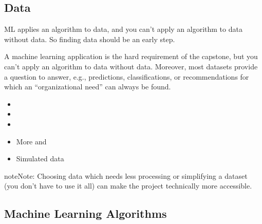 \documentclass[letterpaper,10pt,english]{jupyterBook}
\begin{document}
\subsection{Data}
\label{\detokenize{task1:data}}
\sphinxAtStartPar
ML applies an algorithm to data, and you can’t apply an algorithm to data \sphinxhyphen{}without data. So finding data should be an early step.

\sphinxAtStartPar
A machine learning application is the hard requirement of the capstone, but you can’t apply an algorithm to data \sphinxhyphen{}without data. Moreover, most datasets provide a question to answer, e.g., predictions, classifications, or recommendations for which an “organizational need” can always be found.
\begin{itemize}
\item {} 
\sphinxAtStartPar
{}

\item {} 
\sphinxAtStartPar
{}

\item {} 
\sphinxAtStartPar
{}

\item {} 
\sphinxAtStartPar
More  and 

\item {} 
\sphinxAtStartPar
Simulated data

\end{itemize}

\begin{sphinxadmonition}{note}{Note:}
\sphinxAtStartPar
{} Choosing data which needs less processing or simplifying a dataset (you don’t have to use it all) can make the project technically more accessible.
\end{sphinxadmonition}


\subsection{Machine Learning Algorithms}
\label{\detokenize{task1:machine-learning-algorithms}}
\begin{sphinxShadowBox}


\end{sphinxShadowBox}
\end{document}
